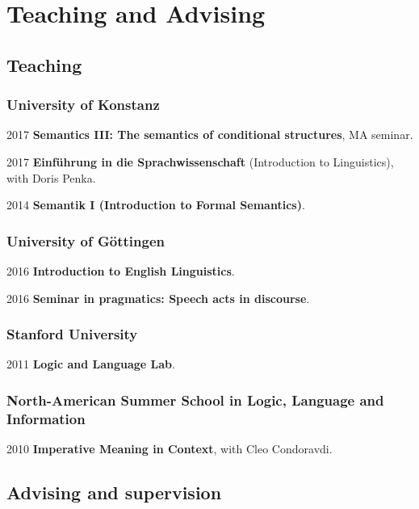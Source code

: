 \section*{Teaching and Advising}
\subsection*{Teaching}
\subsubsection*{University of Konstanz}
\begin{dated}
	\item[2017]
		\textbf{Semantics III: The semantics of conditional structures},
		MA seminar.
	\item[2017]
		\textbf{Einf\"uhrung in die Sprachwissenschaft} (Introduction to Linguistics), 
		with Doris Penka.
	\item[2014]
		\textbf{Semantik I (Introduction to Formal Semantics)}.
\end{dated}
%
\subsubsection*{University of G\"ottingen}
%
\begin{dated}
	\item[2016] \textbf{Introduction to English Linguistics}.
	\item[2016] \textbf{Seminar in pragmatics: Speech acts in discourse}.
\end{dated}
%
\subsubsection*{Stanford University}
\begin{dated}
	\item[2011] \textbf{Logic and Language Lab}.
\end{dated}
%
\subsubsection*{North-American Summer School in Logic, Language and Information}
\begin{dated}
	\item[2010] \textbf{Imperative Meaning in Context}, with Cleo Condoravdi.
\end{dated}
%
\subsection*{Advising and supervision}
